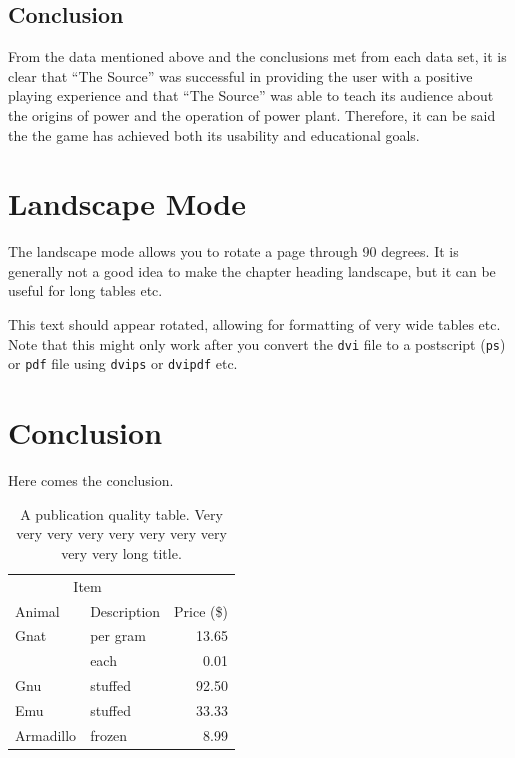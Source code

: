 \documentclass[msc,oneside]{ubcthesis}%
\begin{document}
\newpage
\section{Conclusion}
From the data mentioned above and the conclusions met from each data set, it is clear that ``The Source'' was successful in providing the user with a positive playing experience and that ``The Source'' was able to teach its audience about the origins of power and the operation of power plant. Therefore, it can be said the the game has achieved both its usability and educational goals.


\chapter{Landscape Mode}
The landscape mode allows you to rotate a page through 90 degrees.  It
is generally not a good idea to make the chapter heading landscape,
but it can be useful for long tables etc.

\begin{landscape}
  This text should appear rotated, allowing for formatting of very
  wide tables etc.  Note that this might only work after you convert
  the \texttt{dvi} file to a postscript (\texttt{ps}) or \texttt{pdf}
  file using \texttt{dvips} or \texttt{dvipdf} etc.
\end{landscape}

\chapter{Conclusion}
Here comes the conclusion.

\begin{table}[tbph]
\centering
\caption{A publication quality table. Very very very very very very very very very very long title.
\label{table:food1}}
\begin{tabular}{@{}llr@{}} \toprule 
\multicolumn{2}{c}{Item} \\ \cmidrule(r){1-2} 
Animal & Description & Price (\$)\\ \midrule 
Gnat & per gram & 13.65 \\ 
& each & 0.01 \\ 
Gnu & stuffed & 92.50 \\ 
Emu & stuffed & 33.33 \\ 
Armadillo & frozen & 8.99 \\ \bottomrule 
\end{tabular}
\end{table}
\end{document}
